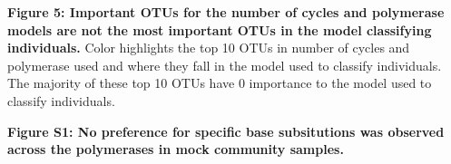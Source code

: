 \documentclass[11pt,]{article}
\begin{document}
\textbf{Figure 5: Important OTUs for the number of cycles and polymerase
models are not the most important OTUs in the model classifying
individuals.} Color highlights the top 10 OTUs in number of cycles and
polymerase used and where they fall in the model used to classify
individuals. The majority of these top 10 OTUs have 0 importance to the
model used to classify individuals.

\newpage

\textbf{Figure S1: No preference for specific base subsitutions was
observed across the polymerases in mock community samples.}
\end{document}
